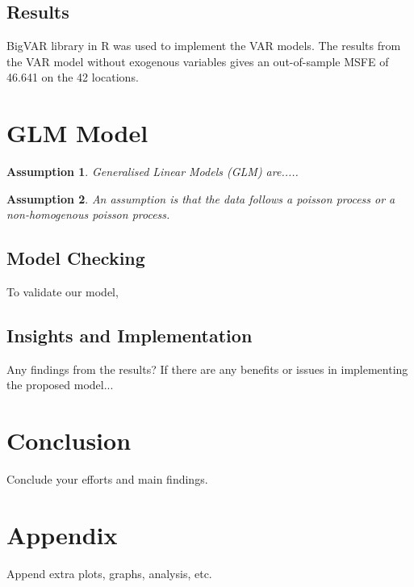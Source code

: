 \documentclass[10pt, letterpaper] {article}
\newtheorem{assumption}{Assumption}
\begin{document}
\subsection{Results}
BigVAR library in R was used to implement the VAR models. The results from the VAR model without exogenous variables gives an out-of-sample MSFE of 46.641 on the 42 locations. 


\section{GLM Model}
\begin{assumption}
Generalised Linear Models (GLM) are.....
\end{assumption}
\begin{assumption}
An assumption is that the data follows a poisson process or a non-homogenous poisson process. 
\end{assumption}

\subsection{Model Checking}
To validate our model,

\subsection{Insights and Implementation}
Any findings from the results? If there are any benefits or issues in implementing the proposed model...
\section{Conclusion}
Conclude your efforts and main findings.

\section{Appendix}
Append extra plots, graphs, analysis, etc. \cite{Williamson2001}

 

\end{document}
